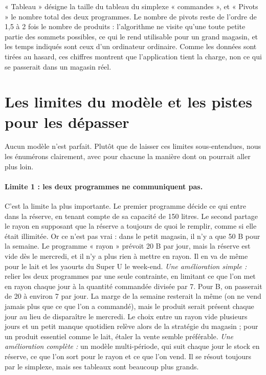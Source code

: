 \documentclass[11pt,a4paper]{article}
\begin{document}
« Tableau » désigne la taille du tableau du simplexe « commandes », et « Pivots » le nombre
total des deux programmes. Le nombre de pivots reste de l'ordre de 1,5 à 2 fois le nombre de
produits : l'algorithme ne visite qu'une toute petite partie des sommets possibles, ce qui le
rend utilisable pour un grand magasin, et les temps indiqués sont ceux d'un ordinateur
ordinaire. Comme les données sont tirées au hasard, ces chiffres montrent que l'application
tient la charge, non ce qui se passerait dans un magasin réel.

\section{Les limites du modèle et les pistes pour les dépasser}
Aucun modèle n'est parfait. Plutôt que de laisser ces limites sous-entendues, nous les
énumérons clairement, avec pour chacune la manière dont on pourrait aller plus loin.

\paragraph{Limite 1 : les deux programmes ne communiquent pas.} C'est la limite la plus
importante. Le premier programme décide ce qui entre dans la réserve, en tenant compte de sa
capacité de 150 litres. Le second partage le rayon en supposant que la réserve a toujours de
quoi le remplir, comme si elle était illimitée. Or ce n'est pas vrai : dans le petit magasin,
il n'y a que 50 B pour la semaine. Le programme « rayon » prévoit 20 B par jour, mais la
réserve est vide dès le mercredi, et il n'y a plus rien à mettre en rayon. Il en va de même
pour le lait et les yaourts du Super U le week-end. \emph{Une amélioration simple :} relier les
deux programmes par une seule contrainte, en limitant ce que l'on met en rayon chaque jour à la
quantité commandée divisée par 7. Pour B, on passerait de 20 à environ 7 par jour. La marge de
la semaine resterait la même (on ne vend jamais plus que ce que l'on a commandé), mais le
produit serait présent chaque jour au lieu de disparaître le mercredi. Le choix entre un rayon
vide plusieurs jours et un petit manque quotidien relève alors de la stratégie du magasin ;
pour un produit essentiel comme le lait, étaler la vente semble préférable. \emph{Une
amélioration complète :} un modèle multi-période, qui suit chaque jour le stock en réserve, ce
que l'on sort pour le rayon et ce que l'on vend. Il se résout toujours par le simplexe, mais ses
tableaux sont beaucoup plus grands.
\end{document}

